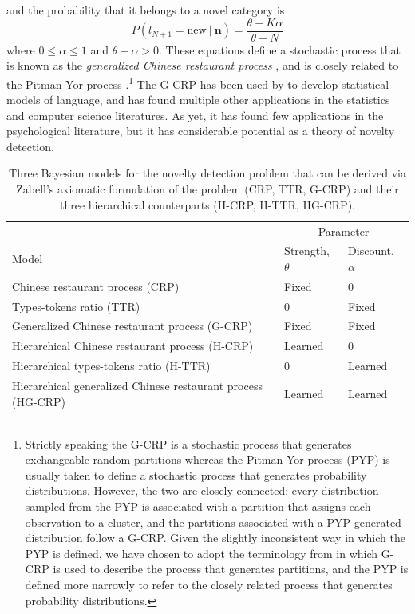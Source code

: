\documentclass[doc]{apa6}
\newcommand{\given}{\ | \ }
\begin{document}
and the probability that it belongs to a novel category is
\begin{equation}
\label{eq:gcrpnew}
P(l_{N+1} = \mbox{new} \given \bm{n}) = \frac{\theta + K\alpha}{\theta + N}
\end{equation}
where $0 \leq \alpha \leq 1$ and $\theta + \alpha > 0$. These equations define a stochastic process that is known as the {\it generalized Chinese restaurant process} \cite<G-CRP: see>{ishwaran_generalized_2003}, and is closely related to the Pitman-Yor process \protect\cite{pitman_two-parameter_1997}.\footnote{Strictly speaking the G-CRP is a stochastic process that generates exchangeable random partitions whereas the Pitman-Yor process (PYP) is usually taken to define a stochastic process that generates probability distributions. However, the two are closely connected: every distribution sampled from the PYP is associated with a partition that assigns each observation to a cluster, and the partitions associated with a PYP-generated distribution follow a G-CRP. Given the slightly inconsistent way in which the PYP is defined, we have chosen to adopt the terminology from  in which G-CRP is used to describe the process that generates partitions, and the PYP is defined more narrowly to refer to the closely related process that generates probability distributions.} The G-CRP has been used by  to develop
statistical models of language, and has found multiple other applications
in the statistics and computer science literatures. As yet, it has
found few applications in the psychological literature, but it has
considerable potential as a theory of novelty detection.

\begin{table}
\caption{Three Bayesian models for the novelty detection problem that can be derived via Zabell's axiomatic formulation of the problem (CRP, TTR, G-CRP) and their three hierarchical counterparts (H-CRP, H-TTR, HG-CRP).}
\label{modellist}
\begin{tabular}{l|ll}
& \multicolumn{2}{|c}{Parameter} \\
Model  &  Strength, $\theta$ &  Discount, $\alpha$ \\ \hline
Chinese restaurant process (CRP) & Fixed & 0 \\
Types-tokens ratio (TTR) & 0 & Fixed \\
Generalized Chinese restaurant process (G-CRP) & Fixed & Fixed \\
Hierarchical Chinese restaurant process (H-CRP) & Learned & 0 \\
Hierarchical types-tokens ratio (H-TTR) & 0 & Learned \\
Hierarchical generalized Chinese restaurant process (HG-CRP) & Learned &  Learned
\end{tabular}
\end{table}
\end{document}

